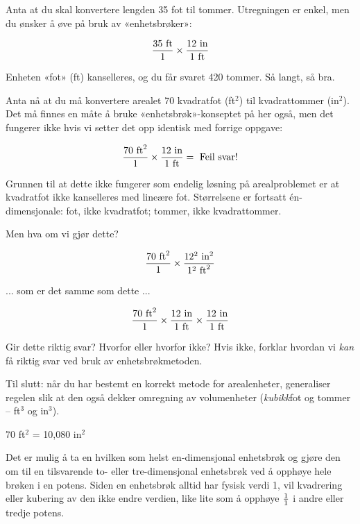 
Anta at du skal konvertere lengden 35 fot til tommer. Utregningen er enkel, men du ønsker å øve på bruk av «enhetsbrøker»:

$${{35 \hbox{ ft}} \over {1}} \times {{12 \hbox{ in}} \over {1 \hbox{ ft}}}$$

Enheten «fot» (ft) kanselleres, og du får svaret 420 tommer. Så langt, så bra.

\vskip 10pt

Anta nå at du må konvertere arealet 70 kvadratfot (ft$^{2}$) til kvadrattommer (in$^{2}$). Det må finnes en måte å bruke «enhetsbrøk»-konseptet på her også, men det fungerer ikke hvis vi setter det opp identisk med forrige oppgave:

$${{70 \hbox{ ft}^2} \over {1}} \times {{12 \hbox{ in}} \over {1 \hbox{ ft}}} = \hbox{ Feil svar!}$$

Grunnen til at dette ikke fungerer som endelig løsning på arealproblemet er at kvadratfot ikke kanselleres med lineære fot. Størrelsene er fortsatt én-dimensjonale: fot, ikke kvadratfot; tommer, ikke kvadrattommer.

Men hva om vi gjør dette?

$${{70 \hbox{ ft}^2} \over {1}} \times {{12^2 \hbox{ in}^2} \over {1^2 \hbox{ ft}^2}}$$

... som er det samme som dette ...

$${{70 \hbox{ ft}^2} \over {1}} \times {{12 \hbox{ in}} \over {1 \hbox{ ft}}} \times {{12 \hbox{ in}} \over {1 \hbox{ ft}}}$$

Gir dette riktig svar? Hvorfor eller hvorfor ikke? Hvis ikke, forklar hvordan vi {\it kan} få riktig svar ved bruk av enhetsbrøkmetoden.

Til slutt: når du har bestemt en korrekt metode for arealenheter, generaliser regelen slik at den også dekker omregning av volumenheter ({\it kubikk}fot og tommer -- ft$^{3}$ og in$^{3}$).







70 ft$^{2}$ = 10,080 in$^{2}$

\vskip 10pt

Det er mulig å ta en hvilken som helst en-dimensjonal enhetsbrøk og gjøre den om til en tilsvarende to- eller tre-dimensjonal enhetsbrøk ved å opphøye hele brøken i en potens. Siden en enhetsbrøk alltid har fysisk verdi 1, vil kvadrering eller kubering av den ikke endre verdien, like lite som å opphøye $1 \over 1$ i andre eller tredje potens.

